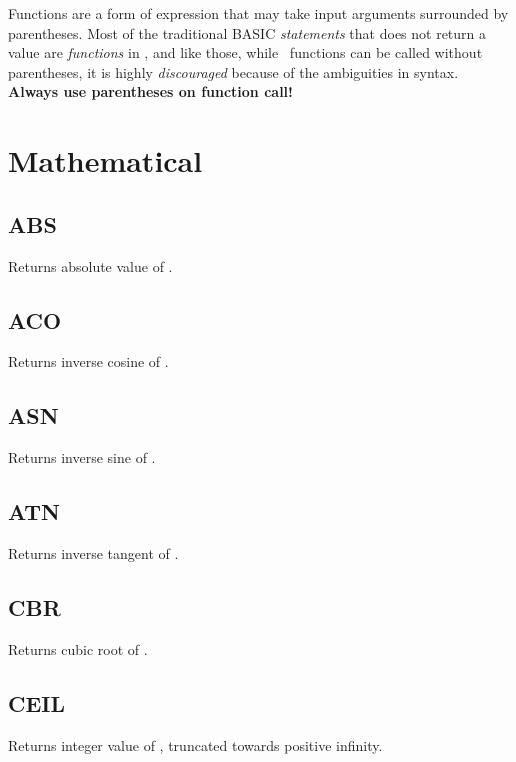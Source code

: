 \label{functions}

Functions are a form of expression that may take input arguments surrounded by parentheses. Most of the traditional BASIC \emph{statements} that does not return a value are \emph{functions} in \tbas , and like those, while \tbas\ functions can be called without parentheses, it is highly \emph{discouraged} because of the ambiguities in syntax. \textbf{Always use parentheses on function call!}

\section{Mathematical}

    \subsection{ABS}
        \par
        Returns absolute value of .
    \subsection{ACO}
        \par
        Returns inverse cosine of .
    \subsection{ASN}
        \par
        Returns inverse sine of .
    \subsection{ATN}
        \par
        Returns inverse tangent of .
    \subsection{CBR}
        \par
        Returns cubic root of .
    \subsection{CEIL}
        \par
        Returns integer value of , truncated towards positive infinity.
